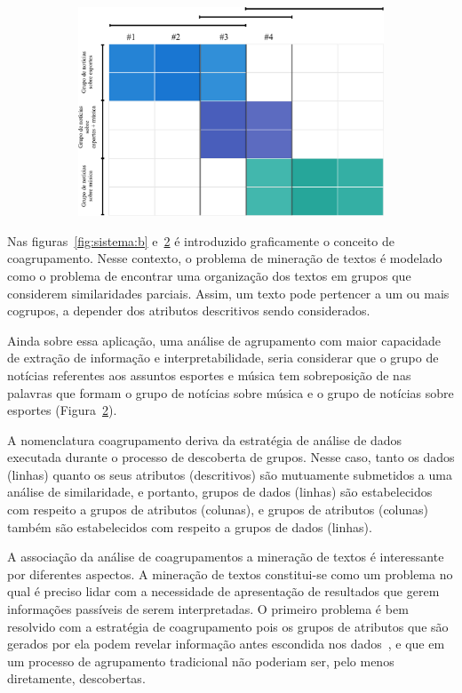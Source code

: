 \documentclass[
    12pt,                %
    oneside,            %
    a4paper,            %
    english,            %
    brazil                %
    ]{abntex2ppgsi}
\begin{document}
\begin{figure} [htpb]
\begin{subfigure}[b]{0.45\textwidth}
        \includegraphics[width=\textwidth]{img/sistema2.png}
        \caption{}
        \label{fig:sistema:c}
    \end{subfigure}
\end{figure}

Nas figuras~\ref{fig:sistema:b} e~\ref{fig:sistema:c} é introduzido graficamente o conceito de coagrupamento.
Nesse contexto, o problema de mineração de textos é modelado como o problema de encontrar uma organização dos textos em grupos que considerem similaridades parciais.
Assim, um texto pode pertencer a um ou mais cogrupos, a depender dos atributos descritivos sendo considerados.

Ainda sobre essa aplicação, uma análise de agrupamento com maior capacidade de extração de informação e interpretabilidade, seria considerar que o grupo de notícias referentes aos assuntos esportes e música tem sobreposição de nas palavras que formam o grupo de notícias sobre música e o grupo de notícias sobre esportes (Figura~\ref{fig:sistema:c}).

A nomenclatura coagrupamento deriva da estratégia de análise de dados executada durante o processo de descoberta de grupos.
Nesse caso, tanto os dados (linhas) quanto os seus atributos (descritivos) são mutuamente submetidos a uma análise de similaridade, e portanto, grupos de dados (linhas) são estabelecidos com respeito a grupos de atributos (colunas), e grupos de atributos (colunas) também são estabelecidos com respeito a grupos de dados (linhas).

A associação da análise de coagrupamentos a mineração de textos é interessante por diferentes aspectos.
A mineração de textos constitui-se como um problema no qual é preciso lidar com a necessidade de apresentação de resultados que gerem informações passíveis de serem interpretadas.
O primeiro problema é bem resolvido com a estratégia de coagrupamento pois os grupos de atributos que são gerados por ela podem revelar informação antes escondida nos dados~\cite{Tjhi2009}, e que em um processo de agrupamento tradicional não poderiam ser, pelo menos diretamente, descobertas.
\end{document}
